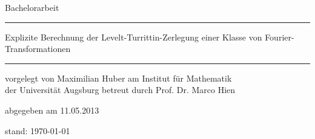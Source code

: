 \begin{titlepage}
  \thispagestyle{empty}
  \newcommand{\Rule}{\rule{\textwidth}{1mm}}
  \begin{center}\sffamily
    \normalfont\sffamily\large
    Bachelorarbeit
    \Rule
    \vspace{5mm}
    \Huge
    {Explizite Berechnung der Levelt-Turrittin-Zerlegung einer Klasse
      von Fourier-Transformationen}
    \vspace{1mm}
    \Rule
  \end{center}
    \vfill
    \normalfont\sffamily\large vorgelegt von
    \Large Maximilian Huber
    \vfill
    \normalfont\sffamily\large am
    \Large Institut für Mathematik\\
    \normalfont\sffamily\large der
    \Large Universität Augsburg
    \vfill
    \normalfont\sffamily\large betreut durch 
    \Large Prof. Dr. Marco Hien \par
    \vfill
    \normalfont\sffamily\large abgegeben am 
    \Large 11.05.2013\\
  \ifnum{}
    \begin{center}
      \normalfont\sffamily\large stand: \today
    \end{center}
  \fi
\end{titlepage}
